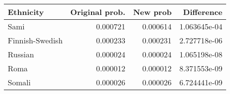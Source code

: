 \begin{tabular}{lrrr}
\toprule
      Ethnicity &  Original prob. &  New prob &   Difference \\
\midrule
           Sami &        0.000721 &  0.000614 & 1.063645e-04 \\
Finnish-Swedish &        0.000233 &  0.000231 & 2.727718e-06 \\
        Russian &        0.000024 &  0.000024 & 1.065198e-08 \\
           Roma &        0.000012 &  0.000012 & 8.371553e-09 \\
         Somali &        0.000026 &  0.000026 & 6.724441e-09 \\
\bottomrule
\end{tabular}
